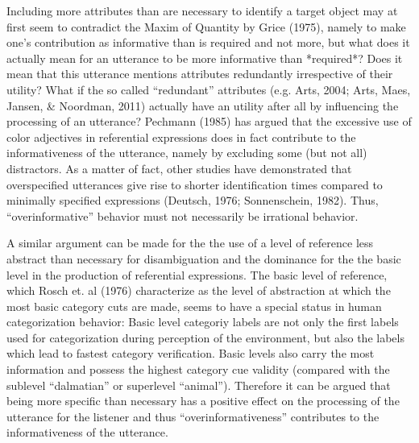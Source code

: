 \documentclass[10pt,letterpaper]{article}
\begin{document}


Including more attributes than are necessary to identify a target object may at first seem to contradict the Maxim of Quantity by Grice (1975), namely to make one's contribution as informative than is required and not more, but what does it actually mean for an utterance to be more informative than *required*? Does it mean that this utterance mentions attributes redundantly irrespective of their utility? What if the so called ``redundant'' attributes (e.g. Arts, 2004; Arts, Maes, Jansen, \& Noordman, 2011) actually have an utility after all by influencing the processing of an utterance? Pechmann (1985) has argued that the excessive use of color adjectives in referential expressions does in fact contribute to the informativeness of the utterance, namely by excluding some (but not all) distractors. As a matter of fact, other studies have demonstrated that overspecified utterances give rise to shorter identification times compared to minimally specified expressions (Deutsch, 1976; Sonnenschein, 1982). Thus, ``overinformative'' behavior must not necessarily be irrational behavior. 

A similar argument can be made for the the use of a level of reference less abstract than necessary for disambiguation and the dominance for the the basic level in the production of referential expressions. The basic level of reference, which Rosch et. al (1976) characterize as the level of abstraction at which the most basic category cuts are made, seems to have a special status in human categorization behavior: Basic level categoriy labels are not only the first labels used for categorization during perception of the environment, but also the labels which lead to fastest category verification. Basic levels also carry the most information and possess the highest category cue validity (compared with the sublevel ``dalmatian'' or superlevel ``animal''). Therefore it can be argued that being more specific than necessary has a positive effect on the processing of the utterance for the listener and thus ``overinformativeness'' contributes to the informativeness of the utterance.
\end{document}
